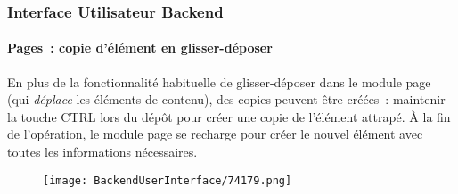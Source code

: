 \begin{frame}[fragile]
	\frametitle{Interface Utilisateur Backend}
	\framesubtitle{Pages~: copie d'élément en glisser-déposer}

	En plus de la fonctionnalité habituelle de glisser-déposer dans le module page (qui \textit{déplace} les
	éléments de contenu), des copies peuvent être créées~: maintenir la touche CTRL lors du dépôt pour créer
	une copie de l'élément attrapé. À la fin de l'opération, le module page se recharge pour créer le nouvel
	élément avec toutes les informations nécessaires.

	\begin{figure}
		\texttt{[image: BackendUserInterface/74179.png]}
	\end{figure}

\end{frame}

